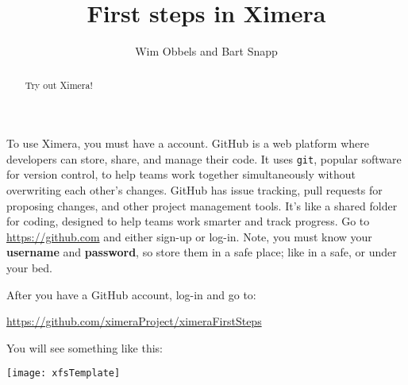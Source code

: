\documentclass{ximera}
\author{Wim Obbels and Bart Snapp}
\title{First steps in Ximera}
\begin{document}
        \begin{abstract}
            Try out Ximera!
        \end{abstract}
        \maketitle

        To use Ximera, you must have a 
        account.
        GitHub is a web platform where developers can store, share, and
        manage
        their code. It uses \verb!git!, popular software for version control,
        to help
        teams work together simultaneously
        without overwriting each other's changes. GitHub has	issue tracking,
        pull requests for proposing changes, and other project management
        tools. It's
        like a shared folder
        for coding, designed to help teams work smarter and track progress.
        Go to \url{https://github.com} and either sign-up or log-in. Note, you
        must
        know
        your \textbf{username} and \textbf{password}, so store them in a safe
        place; like in a safe, or under your bed.

        After you have a GitHub account, log-in and go to:
        \begin{center}
            \url{https://github.com/ximeraProject/ximeraFirstSteps}
        \end{center}

        You will see something like this:
        \pdfOnly{\end{multicols}}
\begin{image}
    \texttt{[image: xfsTemplate]}
\end{image}
\newpage
\end{document}
